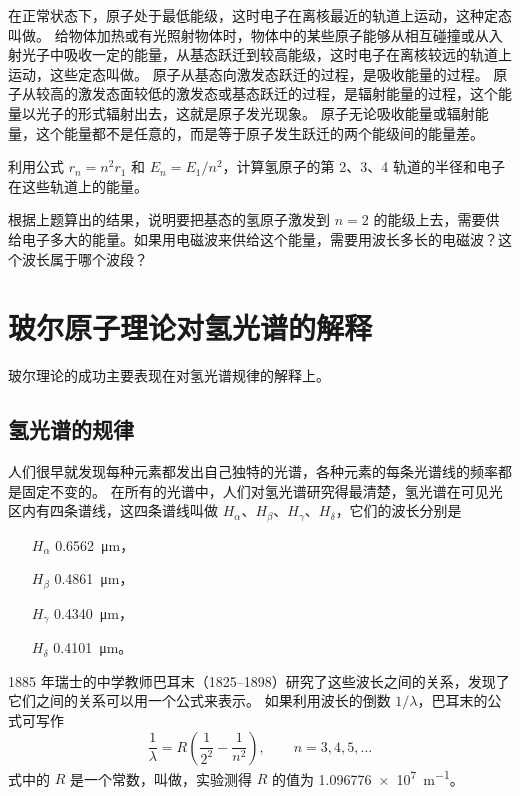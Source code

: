 在正常状态下，原子处于最低能级，这时电子在离核最近的轨道上运动，这种定态叫做。
给物体加热或有光照射物体时，物体中的某些原子能够从相互碰撞或从入射光子中吸收一定的能量，从基态跃迁到较高能级，这时电子在离核较远的轨道上运动，这些定态叫做。
原子从基态向激发态跃迁的过程，是吸收能量的过程。
原子从较高的激发态面较低的激发态或基态跃迁的过程，是辐射能量的过程，这个能量以光子的形式辐射出去，这就是原子发光现象。
原子无论吸收能量或辐射能量，这个能量都不是任意的，而是等于原子发生跃迁的两个能级间的能量差。

\begin{Practice}
\begin{question}
  \item 利用公式 $r_n=n^2r_1$ 和 $E_n=E_1/n^2$，计算氢原子的第 2、3、4 轨道的半径和电子在这些轨道上的能量。
  \item 根据上题算出的结果，说明要把基态的氢原子激发到 $n=2$ 的能级上去，需要供给电子多大的能量。如果用电磁波来供给这个能量，需要用波长多长的电磁波？这个波长属于哪个波段？
\end{question}
\end{Practice}

\section{玻尔原子理论对氢光谱的解释}
玻尔理论的成功主要表现在对氢光谱规律的解释上。
\subsection{氢光谱的规律}
人们很早就发现每种元素都发出自己独特的光谱，各种元素的每条光谱线的频率都是固定不变的。
在所有的光谱中，人们对氢光谱研究得最清楚，氢光谱在可见光区内有四条谱线，这四条谱线叫做 $H_{\alpha}$、$H_{\beta}$、$H_{\gamma}$、$H_{\delta}$，它们的波长分别是
\begin{enumerate}
  \item[$H_{\alpha}$] \qty{0.6562}{\micro m}，
  \item[$H_{\beta}$] \qty{0.4861}{\micro m}，
  \item[$H_{\gamma}$] \qty{0.4340}{\micro m}，
  \item[$H_{\delta}$] \qty{0.4101}{\micro m}。
\end{enumerate}

1885 年瑞士的中学教师巴耳末（1825--1898）研究了这些波长之间的关系，发现了它们之间的关系可以用一个公式来表示。
如果利用波长的倒数 $1/\lambda$，巴耳末的公式可写作
\[\frac{1}{\lambda}=R\left(\frac{1}{2^2}-\frac{1}{n^2}\right),\qquad n=3,4,5,\ldots\]
式中的 $R$ 是一个常数，叫做，实验测得 $R$ 的值为 \qty{1.096776e7}{m^{-1}}。

